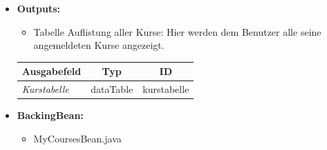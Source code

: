 \begin{itemize}
				
			\item \textbf{Outputs:}
				\begin{itemize}
					\item Tabelle Auflistung aller Kurse: Hier werden dem Benutzer alle seine angemeldeten Kurse angezeigt.
				\end{itemize}
				
				\begin{center}
					\begin{longtable}{|p{5cm} | p{4cm}|p{3cm}|}
						
						\hline \multicolumn{1}{|c|}{\textbf{Ausgabefeld}} & \multicolumn{1}{|c|}{\textbf{Typ}}  &  \multicolumn{1}{|c|}{\textbf{ID}} \\ \hline
						\endfirsthead
						\hline
						\endlastfoot
						\textit{Kurstabelle}  & dataTable & kurstabelle \\ \hline
					\end{longtable}
				\end{center}
				
			\item \textbf{BackingBean:}
				\begin{itemize}
					\item MyCoursesBean.java
				\end{itemize}
		\end{itemize}
		
